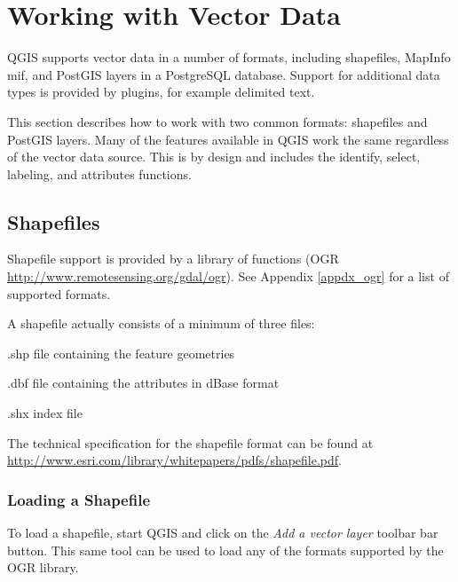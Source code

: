 \chapter{Working with Vector Data}
QGIS supports vector data in a number of formats, including shapefiles,
MapInfo mif, and PostGIS layers in a PostgreSQL database. Support for
additional data types is provided by plugins, for example delimited
text.

This section describes how to work with two common formats:
shapefiles and PostGIS layers. Many of the
features available in QGIS work the same regardless of the vector data source.
This is by design and includes the identify, select, labeling, and attributes
functions.

\section{Shapefiles}
Shapefile support is provided by a library of functions (OGR
\url{http://www.remotesensing.org/gdal/ogr}). See Appendix
\ref{appdx_ogr} for a list of supported formats.

A shapefile actually consists of a minimum of three
files:
\begin{compactenum}
\item .shp file containing the feature geometries
\item .dbf file containing the attributes in dBase format
\item .shx index file
\end{compactenum}
The technical specification for the shapefile format can be found at\\
\url{http://www.esri.com/library/whitepapers/pdfs/shapefile.pdf}.
\subsection{Loading a Shapefile}
To load a
shapefile, start QGIS and click on the \textit{Add a vector layer} toolbar bar
button. This same tool can be used to load any of the
formats supported by the OGR library.

